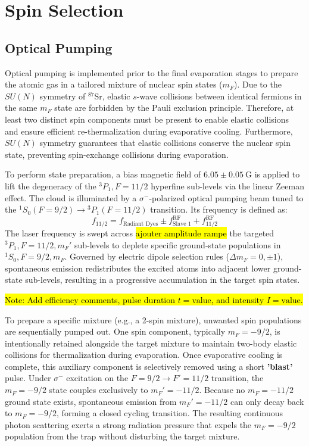\section{Spin Selection}

\subsection{Optical Pumping}
Optical pumping is implemented prior to the final evaporation stages to prepare the atomic gas in a tailored mixture of nuclear spin states ($m_F$). Due to the $SU(N)$ symmetry of $^{87}\text{Sr}$, elastic $s$-wave collisions between identical fermions in the same $m_F$ state are forbidden by the Pauli exclusion principle. Therefore, at least two distinct spin components must be present to enable elastic collisions and ensure efficient re-thermalization during evaporative cooling. Furthermore, $SU(N)$ symmetry guarantees that elastic collisions conserve the nuclear spin state, preventing spin-exchange collisions during evaporation.

To perform state preparation, a bias magnetic field of $6.05 \pm 0.05~\text{G}$ is applied to lift the degeneracy of the $^3P_1, F = 11/2$ hyperfine sub-levels via the linear Zeeman effect. The cloud is illuminated by a $\sigma^-$-polarized optical pumping beam tuned to the $^1S_0 (F=9/2) \rightarrow {}^3P_1 (F=11/2)$ transition. Its frequency is defined as:
\begin{equation}
f_{11/2} = f_{\text{Radiant Dyes}} \pm f_{\text{Slave 1}}^{\text{RF}} + f_{11/2}^{\text{RF}}
\end{equation}
The laser frequency is swept across \hl{ajouter amplitude rampe} the targeted $^3P_1, F = 11/2, m_F'$ sub-levels to deplete specific ground-state populations in $^1S_0, F=9/2, m_F$. Governed by electric dipole selection rules ($\Delta m_F = 0, \pm 1$), spontaneous emission redistributes the excited atoms into adjacent lower ground-state sub-levels, resulting in a progressive accumulation in the target spin states.

\hl{Note: Add efficiency comments, pulse duration $t = \text{value}$, and intensity $I = \text{value}$.}

To prepare a specific mixture (e.g., a 2-spin mixture), unwanted spin populations are sequentially pumped out. One spin component, typically $m_F = -9/2$, is intentionally retained alongside the target mixture to maintain two-body elastic collisions for thermalization during evaporation. Once evaporative cooling is complete, this auxiliary component is selectively removed using a short \textbf{'blast'} pulse. Under $\sigma^-$ excitation on the $F=9/2 \rightarrow F'=11/2$ transition, the $m_F = -9/2$ state couples exclusively to $m_F' = -11/2$. Because no $m_F = -11/2$ ground state exists, spontaneous emission from $m_F' = -11/2$ can only decay back to $m_F = -9/2$, forming a closed cycling transition. The resulting continuous photon scattering exerts a strong radiation pressure that expels the $m_F = -9/2$ population from the trap without disturbing the target mixture.

